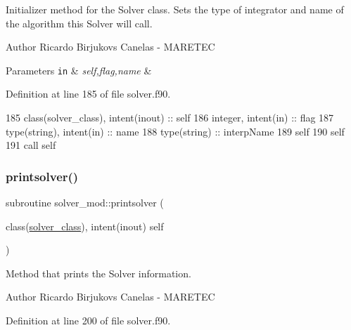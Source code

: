 Initializer method for the Solver class. Sets the type of integrator and name of the algorithm this Solver will call. 

\begin{DoxyAuthor}{Author}
Ricardo Birjukovs Canelas -\/ M\+A\+R\+E\+T\+EC 
\end{DoxyAuthor}

\begin{DoxyParams}[1]{Parameters}
\mbox{\tt in}  & {\em self,flag,name} & \\
\hline
\end{DoxyParams}


Definition at line 185 of file solver.\+f90.


\begin{DoxyCode}
185     \textcolor{keywordtype}{class}(solver\_class), \textcolor{keywordtype}{intent(inout)} :: self
186     \textcolor{keywordtype}{integer}, \textcolor{keywordtype}{intent(in)} :: flag
187     \textcolor{keywordtype}{type}(string), \textcolor{keywordtype}{intent(in)} :: name
188     \textcolor{keywordtype}{type}(string) :: interpName
189     self%
190     self%
191     \textcolor{keyword}{call }self%
\end{DoxyCode}
\mbox{\label{namespacesolver__mod_a54ea6899cce026a7a5da2dd05922628f}} 
\subsubsection{\texorpdfstring{printsolver()}{printsolver()}}
{\footnotesize\ttfamily subroutine solver\+\_\+mod\+::printsolver (\begin{DoxyParamCaption}\item[{class(\mbox{\hyperlink{structsolver__mod_1_1solver__class}{solver\+\_\+class}}), intent(inout)}]{self }\end{DoxyParamCaption})\hspace{0.3cm}{\ttfamily [private]}}



Method that prints the Solver information. 

\begin{DoxyAuthor}{Author}
Ricardo Birjukovs Canelas -\/ M\+A\+R\+E\+T\+EC 
\end{DoxyAuthor}


Definition at line 200 of file solver.\+f90.



